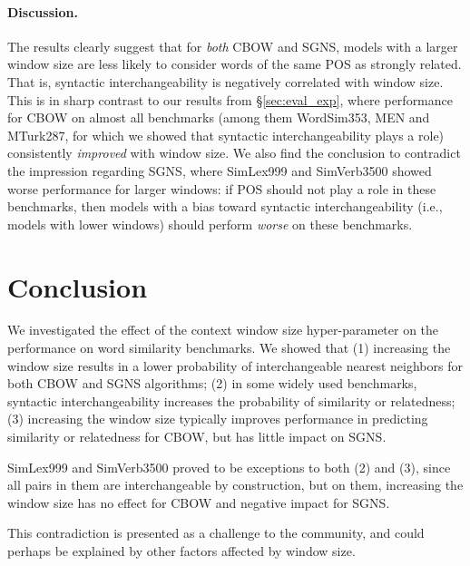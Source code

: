 \documentclass[11pt,a4paper]{article}
\begin{document}
    \paragraph{Discussion.}
    
    The results clearly suggest that for \textit{both} CBOW and SGNS,
    models with a larger window size are less likely to consider words
    of the same POS as strongly related.
    That is, syntactic interchangeability is negatively correlated with window size.
    This is in sharp contrast to our results from \S\ref{sec:eval_exp},
    where performance for CBOW on almost all benchmarks
    (among them  WordSim353, MEN and MTurk287, for which we showed that
    syntactic interchangeability plays a role) consistently
    \textit{improved} with window size.
    We also find the conclusion to contradict the impression regarding SGNS,
    where SimLex999 and SimVerb3500 showed worse performance for larger windows:
    if POS should not play a role in these benchmarks,
    then models with a bias toward syntactic interchangeability (i.e., models with lower windows)
    should perform \textit{worse} on these benchmarks.
    
    
    

\section{Conclusion}\label{sec:conclusion}

    We investigated the effect of the context window size hyper-parameter
    on the performance on word similarity benchmarks.
    We showed that
    (1) increasing the window size results in a lower probability of interchangeable
    nearest neighbors for both CBOW and SGNS algorithms;
    (2) in some widely used benchmarks,
    syntactic interchangeability increases the probability of similarity or relatedness;
    (3) increasing the window size typically improves performance
    in predicting similarity or relatedness for CBOW,
    but has little impact on SGNS.
    
    SimLex999 and SimVerb3500 proved to be exceptions to both (2) and (3),
    since all pairs in them are interchangeable by construction,
    but on them, increasing the window size has no effect for CBOW
    and negative impact for SGNS.
    
    This contradiction is presented as a challenge to the community,
    and could perhaps be explained by other factors affected by window size.
    
\end{document}
